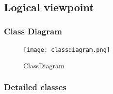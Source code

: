 \documentclass[12pt]{article}
\begin{document}
\subsection{Logical viewpoint}

\subsubsection{Class Diagram}
 \FloatBarrier
\begin{figure}[htbp]
\centering
\texttt{[image: classdiagram.png]}
\caption{ClassDiagram }
\label{archdsgn}
\end{figure}
\subsubsection{Detailed classes}
\FloatBarrier
\end{document}
